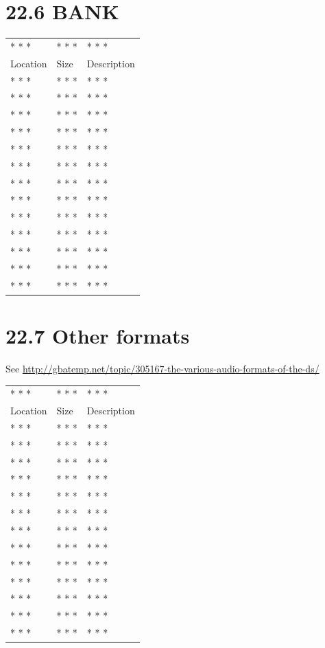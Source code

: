 \documentclass[
]{book}
\begin{document}
\hypertarget{bank}{%
\section{22.6 BANK}\label{bank}}

\begin{longtable}[]{@{}lll@{}}
\toprule()
\endhead
* * * & * * * & * * * \\
Location & Size & Description \\
* * * & * * * & * * * \\
* * * & * * * & * * * \\
* * * & * * * & * * * \\
* * * & * * * & * * * \\
* * * & * * * & * * * \\
* * * & * * * & * * * \\
* * * & * * * & * * * \\
* * * & * * * & * * * \\
* * * & * * * & * * * \\
* * * & * * * & * * * \\
* * * & * * * & * * * \\
* * * & * * * & * * * \\
* * * & * * * & * * * \\
\bottomrule()
\end{longtable}

\hypertarget{other-formats}{%
\section{22.7 Other formats}\label{other-formats}}

See \url{http://gbatemp.net/topic/305167-the-various-audio-formats-of-the-ds/}

\begin{longtable}[]{@{}lll@{}}
\toprule()
\endhead
* * * & * * * & * * * \\
Location & Size & Description \\
* * * & * * * & * * * \\
* * * & * * * & * * * \\
* * * & * * * & * * * \\
* * * & * * * & * * * \\
* * * & * * * & * * * \\
* * * & * * * & * * * \\
* * * & * * * & * * * \\
* * * & * * * & * * * \\
* * * & * * * & * * * \\
* * * & * * * & * * * \\
* * * & * * * & * * * \\
* * * & * * * & * * * \\
* * * & * * * & * * * \\
\bottomrule()
\end{longtable}
\end{document}

